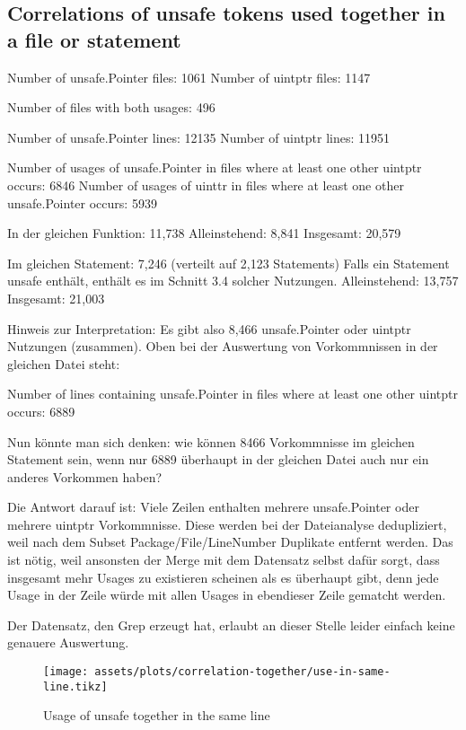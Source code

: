 
\subsection{Correlations of unsafe tokens used together in a file or statement}\label{subsec:results-correlation-together}

Number of unsafe.Pointer files: 1061
Number of uintptr files: 1147

Number of files with both usages: 496

Number of unsafe.Pointer lines: 12135
Number of uintptr lines: 11951

Number of usages of unsafe.Pointer in files where at least one other uintptr occurs: 6846
Number of usages of uinttr in files where at least one other unsafe.Pointer occurs: 5939

In der gleichen Funktion: 11,738
Alleinstehend: 8,841
Insgesamt: 20,579

Im gleichen Statement: 7,246 (verteilt auf 2,123 Statements)
Falls ein Statement unsafe enthält, enthält es im Schnitt 3.4 solcher Nutzungen.
Alleinstehend: 13,757
Insgesamt: 21,003

Hinweis zur Interpretation: Es gibt also 8,466 unsafe.Pointer oder uintptr Nutzungen (zusammen).
Oben bei der Auswertung von Vorkommnissen in der gleichen Datei steht:

Number of lines containing unsafe.Pointer in files where at least one other uintptr occurs: 6889

Nun könnte man sich denken: wie können 8466 Vorkommnisse im gleichen Statement sein, wenn nur 6889 überhaupt in der
gleichen Datei auch nur ein anderes Vorkommen haben?

Die Antwort darauf ist: Viele Zeilen enthalten mehrere unsafe.Pointer oder mehrere uintptr Vorkommnisse.
Diese werden bei der Dateianalyse dedupliziert, weil nach dem Subset Package/File/LineNumber Duplikate entfernt werden.
Das ist nötig, weil ansonsten der Merge mit dem Datensatz selbst dafür sorgt, dass insgesamt mehr Usages zu existieren
scheinen als es überhaupt gibt, denn jede Usage in der Zeile würde mit allen Usages in ebendieser Zeile gematcht werden.

Der Datensatz, den Grep erzeugt hat, erlaubt an dieser Stelle leider einfach keine genauere Auswertung.

\begin{figure}[ht]
    \centering
    {\scriptsize \texttt{[image: assets/plots/correlation-together/use-in-same-line.tikz]}}
    \caption{Usage of unsafe together in the same line}
    \label{fig:correlations-unsafe-usage-same-line}
\end{figure}

